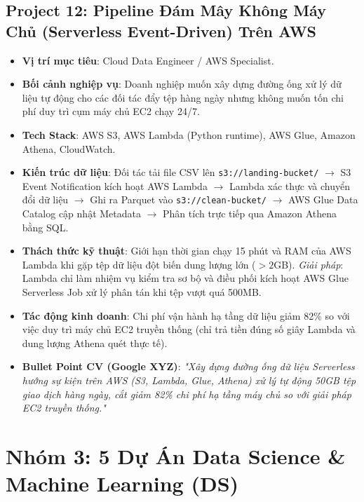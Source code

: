 \subsection{Project 12: Pipeline Đám Mây Không Máy Chủ (Serverless Event-Driven) Trên AWS}
\begin{itemize}
    \item \textbf{Vị trí mục tiêu}: Cloud Data Engineer / AWS Specialist.
    \item \textbf{Bối cảnh nghiệp vụ}: Doanh nghiệp muốn xây dựng đường ống xử lý dữ liệu tự động cho các đối tác đẩy tệp hàng ngày nhưng không muốn tốn chi phí duy trì cụm máy chủ EC2 chạy 24/7.
    \item \textbf{Tech Stack}: AWS S3, AWS Lambda (Python runtime), AWS Glue, Amazon Athena, CloudWatch.
    \item \textbf{Kiến trúc dữ liệu}: Đối tác tải file CSV lên \texttt{s3://landing-bucket/} $\rightarrow$ S3 Event Notification kích hoạt AWS Lambda $\rightarrow$ Lambda xác thực và chuyển đổi dữ liệu $\rightarrow$ Ghi ra Parquet vào \texttt{s3://clean-bucket/} $\rightarrow$ AWS Glue Data Catalog cập nhật Metadata $\rightarrow$ Phân tích trực tiếp qua Amazon Athena bằng SQL.
    \item \textbf{Thách thức kỹ thuật}: Giới hạn thời gian chạy 15 phút và RAM của AWS Lambda khi gặp tệp dữ liệu đột biến dung lượng lớn ($> 2$GB). \textit{Giải pháp}: Lambda chỉ làm nhiệm vụ kiểm tra sơ bộ và điều phối kích hoạt AWS Glue Serverless Job xử lý phân tán khi tệp vượt quá 500MB.
    \item \textbf{Tác động kinh doanh}: Chi phí vận hành hạ tầng dữ liệu giảm 82\% so với việc duy trì máy chủ EC2 truyền thống (chỉ trả tiền đúng số giây Lambda và dung lượng Athena quét thực tế).
    \item \textbf{Bullet Point CV (Google XYZ)}: \textit{"Xây dựng đường ống dữ liệu Serverless hướng sự kiện trên AWS (S3, Lambda, Glue, Athena) xử lý tự động 50GB tệp giao dịch hàng ngày, cắt giảm 82\% chi phí hạ tầng máy chủ so với giải pháp EC2 truyền thống."}
\end{itemize}

\section{Nhóm 3: 5 Dự Án Data Science \& Machine Learning (DS)}

